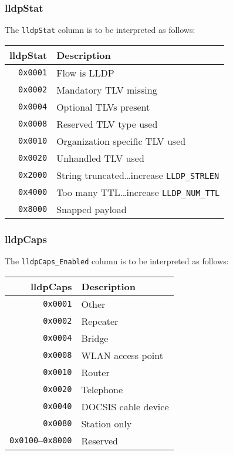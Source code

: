 \documentclass[documentation]{subfiles}
\begin{document}
\subsubsection{lldpStat}\label{lldpStat}
The {\tt lldpStat} column is to be interpreted as follows:
\begin{longtable}{rl}
    \toprule
    {\bf lldpStat} & {\bf Description}\\
    \midrule\endhead%
    {\tt 0x0001} & Flow is LLDP\\
    {\tt 0x0002} & Mandatory TLV missing\\
    {\tt 0x0004} & Optional TLVs present\\
    {\tt 0x0008} & Reserved TLV type used\\
    {\tt 0x0010} & Organization specific TLV used\\
    {\tt 0x0020} & Unhandled TLV used\\
    {\tt 0x2000} & String truncated\ldots increase {\tt LLDP\_STRLEN}\\
    {\tt 0x4000} & Too many TTL\ldots increase {\tt LLDP\_NUM\_TTL}\\
    {\tt 0x8000} & Snapped payload\\
    \bottomrule
\end{longtable}

\subsubsection{lldpCaps}\label{lldpCaps}
The {\tt lldpCaps\_Enabled} column is to be interpreted as follows:
\begin{longtable}{rl}
    \toprule
    {\bf lldpCaps} & {\bf Description}\\
    \midrule\endhead%
    {\tt 0x0001}         & Other\\
    {\tt 0x0002}         & Repeater\\
    {\tt 0x0004}         & Bridge\\
    {\tt 0x0008}         & WLAN access point\\
    {\tt 0x0010}         & Router\\
    {\tt 0x0020}         & Telephone\\
    {\tt 0x0040}         & DOCSIS cable device\\
    {\tt 0x0080}         & Station only\\
    {\tt 0x0100--0x8000} & Reserved\\
    \bottomrule
\end{longtable}
\end{document}
